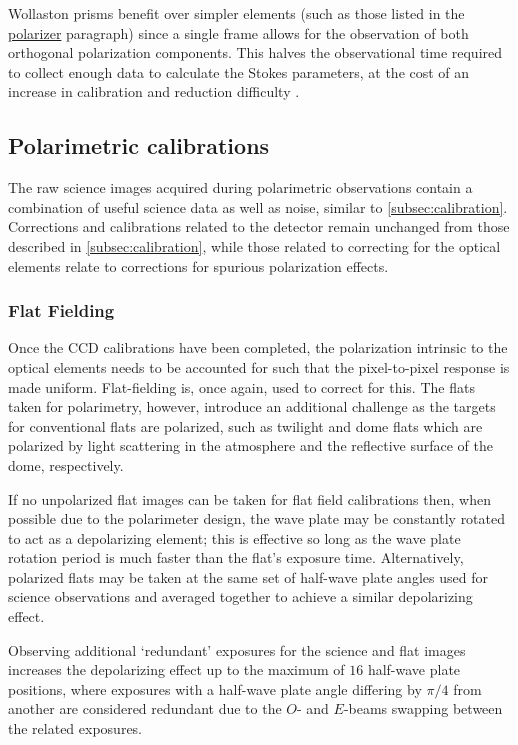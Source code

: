 Wollaston prisms benefit over simpler elements (such as those listed in the \hyperref[par:polarizer]{polarizer} paragraph) since a single frame allows for the observation of both orthogonal polarization components. This halves the observational time required to collect enough data to calculate the Stokes parameters, at the cost of an increase in calibration and reduction difficulty \citep{wollaston}.

\subsection{Polarimetric calibrations}\label{subsec:pol_cal}

The raw science images acquired during polarimetric observations contain a combination of useful science data as well as noise, similar to \autoref{subsec:calibration}. Corrections and calibrations related to the detector remain unchanged from those described in \autoref{subsec:calibration}, while those related to correcting for the optical elements relate to corrections for spurious polarization effects.

\subsubsection{Flat Fielding}\label{subsubsec:pol_flat}

Once the \gls{CCD} calibrations have been completed, the polarization intrinsic to the optical elements needs to be accounted for such that the pixel-to-pixel response is made uniform. Flat-fielding is, once again, used to correct for this. The flats taken for polarimetry, however, introduce an additional challenge as the targets for conventional flats are polarized, such as twilight and dome flats which are polarized by light scattering in the atmosphere and the reflective surface of the dome, respectively.

If no unpolarized flat images can be taken for flat field calibrations then, when possible due to the polarimeter design, the wave plate may be constantly rotated to act as a depolarizing element; this is effective so long as the wave plate rotation period is much faster than the flat's exposure time. Alternatively, polarized flats may be taken at the same set of half-wave plate angles used for science observations and averaged together to achieve a similar depolarizing effect.

Observing additional `redundant' exposures for the science and flat images increases the depolarizing effect up to the maximum of $16$ half-wave plate positions, where exposures with a half-wave plate angle differing by $\pi / 4$ from another are considered redundant due to the $O$- and $E$-beams swapping between the related exposures.

